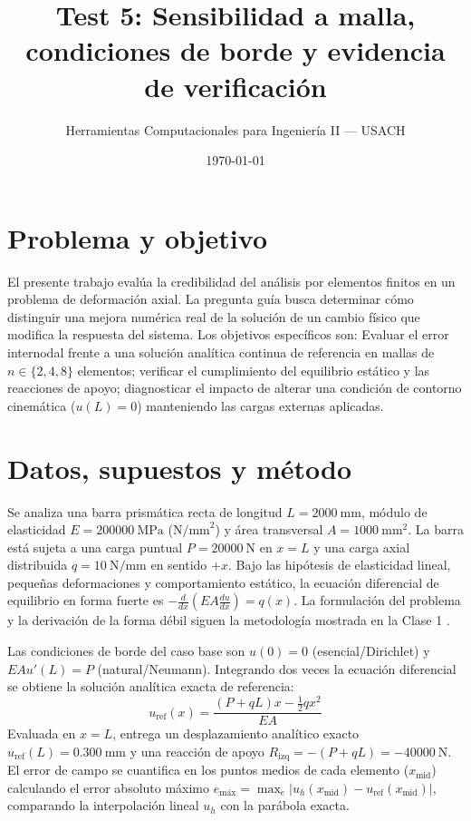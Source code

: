 \documentclass[11pt]{article}
\title{\textbf{Test 5: Sensibilidad a malla, condiciones de borde y evidencia de verificación}}
\author{Herramientas Computacionales para Ingeniería II --- USACH}
\date{\today}
\begin{document}
\maketitle

\section{Problema y objetivo}
El presente trabajo evalúa la credibilidad del análisis por elementos finitos en un problema de deformación axial. La pregunta guía busca determinar cómo distinguir  una mejora numérica real de la solución de un cambio físico que modifica la respuesta del sistema. Los objetivos específicos son: Evaluar el error internodal frente a una solución analítica continua de referencia en mallas de $n \in \{2, 4, 8\}$ elementos; verificar el cumplimiento del equilibrio estático y las reacciones de apoyo; diagnosticar el impacto de alterar una condición de contorno cinemática ($u(L)=0$) manteniendo las cargas externas aplicadas.

\section{Datos, supuestos y método}
Se analiza una barra prismática recta de longitud $L = \SI{2000}{\mm}$, módulo de elasticidad $E = \SI{200000}{\mega\pascal}$ ($\text{N/mm}^2$) y área transversal $A = \SI{1000}{\mm\squared}$. La barra está sujeta a una carga puntual $P = \SI{20000}{\N}$ en $x = L$ y una carga axial distribuida $q = \SI{10}{\N/\mm}$ en sentido $+x$. Bajo las hipótesis de elasticidad lineal, pequeñas deformaciones y comportamiento estático, la ecuación diferencial de equilibrio en forma fuerte es $-\frac{d}{dx}\left(EA \frac{du}{dx}\right) = q(x)$. La formulación del problema y la derivación de la forma débil siguen la metodología mostrada en la Clase 1 \cite{guzman_u3l1}.

Las condiciones de borde del caso base son $u(0) = 0$ (esencial/Dirichlet) y $EA u'(L) = P$ (natural/Neumann). Integrando dos veces la ecuación diferencial se obtiene la solución analítica exacta de referencia:
\begin{equation}
u_{\text{ref}}(x) = \frac{(P + qL)x - \frac{1}{2}qx^2}{EA}
\end{equation}
Evaluada en $x = L$, entrega un desplazamiento analítico exacto $u_{\text{ref}}(L) = \SI{0.300}{\mm}$ y una reacción de apoyo $R_{\text{izq}} = -(P + qL) = \SI{-40000}{\N}$. El error de campo se cuantifica en los puntos medios de cada elemento ($x_{\text{mid}}$) calculando el error absoluto máximo $e_{\text{máx}} = \max_e |u_h(x_{\text{mid}}) - u_{\text{ref}}(x_{\text{mid}})|$, comparando la interpolación lineal $u_h$ con la parábola exacta.
\end{document}
